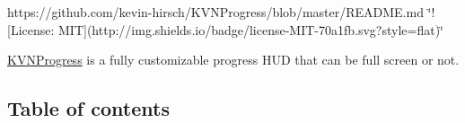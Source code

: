

\href{https://coveralls.io/r/spacedrabbit/KVNProgress?branch=test-jam-test-coverage}{\tt } \href{https://travis-ci.org/spacedrabbit/KVNProgress}{\tt } \href{https://twitter.com/kevinh6113}{\tt } https\+://github.com/kevin-\/hirsch/\+K\+V\+N\+Progress/blob/master/\+R\+E\+A\+D\+M\+E.\+md \char`\"{}!\mbox{[}\+License\+: M\+I\+T\mbox{]}(http\+://img.\+shields.\+io/badge/license-\/\+M\+I\+T-\/70a1fb.\+svg?style=flat)\char`\"{} \href{https://github.com/kevin-hirsch/KVNProgress}{\tt } \href{http://cocoadocs.org/docsets/KVNProgress/}{\tt }

\mbox{\hyperlink{interface_k_v_n_progress}{K\+V\+N\+Progress}} is a fully customizable progress H\+UD that can be full screen or not. 



\subsection*{Table of contents}


